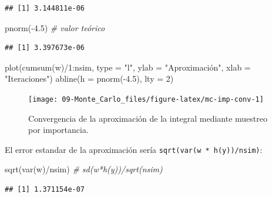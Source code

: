 \documentclass[
]{book}
\newenvironment{Shaded}{\begin{snugshade}}{\end{snugshade}}
\newcommand{\AttributeTok}[1]{\textcolor[rgb]{0.77,0.63,0.00}{#1}}
\newcommand{\CommentTok}[1]{\textcolor[rgb]{0.56,0.35,0.01}{\textit{#1}}}
\newcommand{\DecValTok}[1]{\textcolor[rgb]{0.00,0.00,0.81}{#1}}
\newcommand{\FloatTok}[1]{\textcolor[rgb]{0.00,0.00,0.81}{#1}}
\newcommand{\FunctionTok}[1]{\textcolor[rgb]{0.00,0.00,0.00}{#1}}
\newcommand{\NormalTok}[1]{#1}
\newcommand{\SpecialCharTok}[1]{\textcolor[rgb]{0.00,0.00,0.00}{#1}}
\newcommand{\StringTok}[1]{\textcolor[rgb]{0.31,0.60,0.02}{#1}}
\theoremstyle{break}
\theoremstyle{definition}
\theoremstyle{definition}
\theoremstyle{definition}
\theoremstyle{definition}
\theoremstyle{remark}
\begin{document}
\begin{verbatim}
## [1] 3.144811e-06
\end{verbatim}

\begin{Shaded}
\begin{Highlighting}[]
\FunctionTok{pnorm}\NormalTok{(}\SpecialCharTok{{-}}\FloatTok{4.5}\NormalTok{)  }\CommentTok{\# valor teórico}
\end{Highlighting}
\end{Shaded}

\begin{verbatim}
## [1] 3.397673e-06
\end{verbatim}

\begin{Shaded}
\begin{Highlighting}[]
\FunctionTok{plot}\NormalTok{(}\FunctionTok{cumsum}\NormalTok{(w)}\SpecialCharTok{/}\DecValTok{1}\SpecialCharTok{:}\NormalTok{nsim, }\AttributeTok{type =} \StringTok{"l"}\NormalTok{, }\AttributeTok{ylab =} \StringTok{"Aproximación"}\NormalTok{, }\AttributeTok{xlab =} \StringTok{"Iteraciones"}\NormalTok{)}
\FunctionTok{abline}\NormalTok{(}\AttributeTok{h =} \FunctionTok{pnorm}\NormalTok{(}\SpecialCharTok{{-}}\FloatTok{4.5}\NormalTok{), }\AttributeTok{lty =} \DecValTok{2}\NormalTok{)}
\end{Highlighting}
\end{Shaded}

\begin{figure}[!htb]

{\centering \texttt{[image: 09-Monte\_Carlo\_files/figure-latex/mc-imp-conv-1]} 

}

\caption{Convergencia de la aproximación de la integral mediante muestreo por importancia.}\label{fig:mc-imp-conv}
\end{figure}

El error estandar de la aproximación sería \texttt{sqrt(var(w\ *\ h(y))/nsim)}:

\begin{Shaded}
\begin{Highlighting}[]
\FunctionTok{sqrt}\NormalTok{(}\FunctionTok{var}\NormalTok{(w)}\SpecialCharTok{/}\NormalTok{nsim) }\CommentTok{\# sd(w*h(y))/sqrt(nsim)   }
\end{Highlighting}
\end{Shaded}

\begin{verbatim}
## [1] 1.371154e-07
\end{verbatim}
\end{document}
